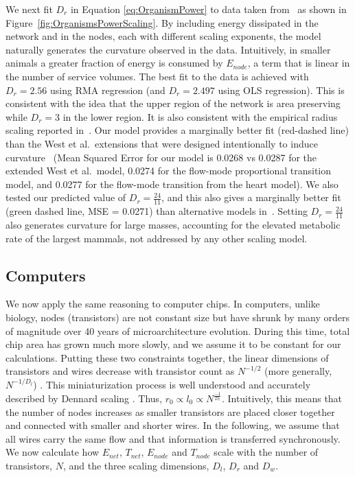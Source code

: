 \documentclass[12pt]{article}
\begin{document}
We next fit $D_r$ in Equation \ref{eq:OrganismPower} to data taken from~\cite{kolokotrones2010curvature} as shown
in Figure~\ref{fig:OrganismsPowerScaling}.  By including energy dissipated in
the network and in the nodes, each with different scaling exponents, the model
naturally generates the curvature observed in the data.  Intuitively, in
smaller animals a greater fraction of energy is consumed by $E_{node}$, a term
that is linear in the number of service volumes. The best fit to
the data is achieved with $D_r = 2.56$ using RMA regression (and $D_r
= 2.497$ using OLS regression).
This is consistent with the idea that the upper region of the network
is area preserving while $D_r = 3$
in the lower region.  It is also consistent with the empirical radius
scaling reported in~\cite{newberry2015testing}.  Our model provides a marginally better
fit (red-dashed line) than the West et al.\ extensions that were
designed intentionally to induce curvature~\cite{kolokotrones2010curvature} (Mean Squared Error for
our model is 0.0268 vs 0.0287 for the extended West et al.\ model, 0.0274 for
the flow-mode proportional transition model, and 0.0277 for the flow-mode
transition from the heart model).  We also tested our predicted value of $D_r =
\frac{24}{11}$, and this also gives a marginally better fit (green dashed line, MSE
= 0.0271) than alternative models in~\cite{kolokotrones2010curvature}. 
Setting $D_r =\frac{24}{11}$ also generates curvature for large
masses, accounting for the elevated metabolic rate of the largest
mammals, not addressed by any other scaling model.
 


\subsection{Computers}
\label{sec:computers}

We now apply the same reasoning to computer chips. 
In computers, unlike biology,  nodes (transistors) 
are not constant size but have shrunk by many orders of magnitude over 40
years of microarchitecture evolution.  During this time, total chip area has grown
much more slowly, and we assume it to be constant for our calculations.
Putting these two constraints together, the linear dimensions of transistors
and wires decrease with transistor count as $N^{-1/2}$ (more generally,
$N^{-1/D_l}$) \cite{moses08}.  This miniaturization process is well understood
and accurately described by Dennard scaling \cite{dennard74}.  
Thus, $r_0 \propto l_0 \propto N^{\frac{-1}{D_l}}$. Intuitively, this means
that the number of nodes increases as smaller transistors are placed closer
together and connected with smaller and shorter wires. In the following,
we assume that all wires carry the same flow and that information is
transferred synchronously. We now calculate how $E_{net}$, $T_{net}$,
$E_{node}$ and $T_{node}$ scale with the number of transistors, $N$, and the three
scaling dimensions, $D_l$, $D_r$ and $D_w$.
\end{document}
